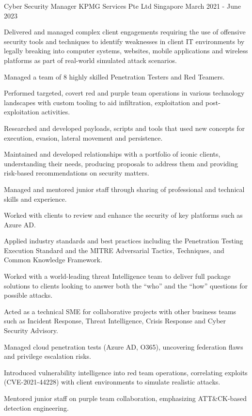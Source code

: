 \begin{cventries}
  \cventry
    {Cyber Security Manager} %
    {KPMG Services Pte Ltd} %
    {Singapore} %
    {March 2021 - June 2023} %
    {
      \begin{cvitems} %
            \item{Delivered and managed complex client engagements requiring the use of offensive security tools and techniques to identify weaknesses in client IT environments by legally breaking into computer systems, websites, mobile applications and wireless platforms as part of real-world simulated attack scenarios.}
            \item{Managed a team of 8 highly skilled Penetration Testers and Red Teamers.}
            \item{Performed targeted, covert red and purple team operations in various technology landscapes with custom tooling to aid infiltration, exploitation and post-exploitation activities.}
            \item{Researched and developed payloads, scripts and tools that used new concepts for execution, evasion, lateral movement and persistence.}
            \item{Maintained and developed relationships with a portfolio of iconic clients, understanding their needs, producing proposals to address them and providing risk-based recommendations on security matters.}
            \item{Managed and mentored junior staff through sharing of professional and technical skills and experience.}
            \item{Worked with clients to review and enhance the security of key platforms such as Azure AD.}
            \item{Applied industry standards and best practices including the Penetration Testing Execution Standard and the MITRE Adversarial Tactics, Techniques, and Common Knowledge Framework.}
            \item{Worked with a world-leading threat Intelligence team to deliver full package solutions to clients looking to answer both the ``who'' and the ``how'' questions for possible attacks.}
            \item{Acted as a technical SME for collaborative projects with other business teams such as Incident Response, Threat Intelligence, Crisis Response and Cyber Security Advisory.}
            \item{Managed cloud penetration tests (Azure AD, O365), uncovering federation flaws and privilege escalation risks.}
            \item{Introduced vulnerability intelligence into red team operations, correlating exploits (CVE-2021-44228) with client environments to simulate realistic attacks.}
            \item{Mentored junior staff on purple team collaboration, emphasizing ATT\&CK-based detection engineering.}
      \end{cvitems}
    }


\end{cventries}
